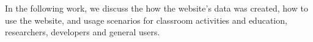 In the following work, we discuss the how the website's data was created, how to use the website, and usage scenarios for classroom activities and education, researchers, developers and general users.







